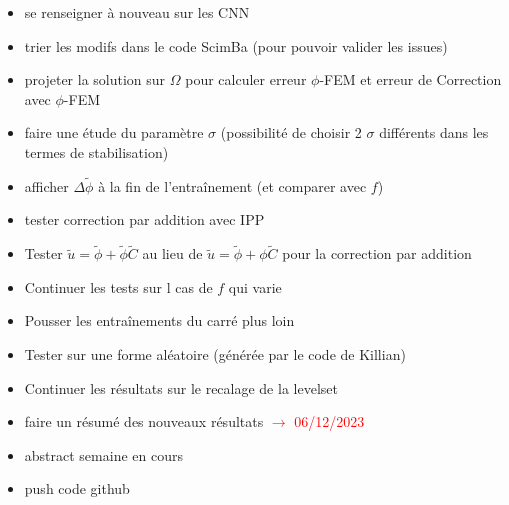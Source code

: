 \begin{itemize}[label=$\square$]
	\item se renseigner à nouveau sur les CNN
	\item trier les modifs dans le code ScimBa (pour pouvoir valider les issues)
	\item[\done] projeter la solution sur $\Omega$ pour calculer erreur $\phi$-FEM et erreur de Correction avec $\phi$-FEM
	\item faire une étude du paramètre $\sigma$ (possibilité de choisir 2 $\sigma$ différents dans les termes de stabilisation)
	\item afficher $\Delta \tilde{\phi}$ à la fin de l'entraînement (et comparer avec $f$)
	\item tester correction par addition avec IPP
	\item Tester $\tilde{u}=\tilde{\phi}+\tilde{\phi}\tilde{C}$ au lieu de $\tilde{u}=\tilde{\phi}+\phi\tilde{C}$ pour la correction par addition
	\item Continuer les tests sur l cas de $f$ qui varie
	\item Pousser les entraînements du carré plus loin
	\item Tester sur une forme aléatoire (générée par le code de Killian)
	\item Continuer les résultats sur le recalage de la levelset
	\item faire un résumé des nouveaux résultats \textcolor{red}{$\rightarrow$ 06/12/2023}
	\item[\done] abstract semaine en cours
	\item[\done] push code github
\end{itemize}